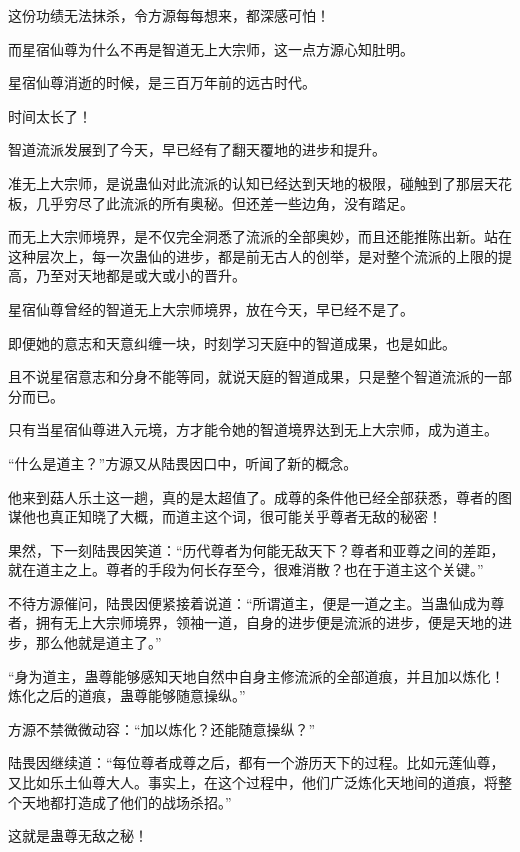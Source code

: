 \begin{this_body}
这份功绩无法抹杀，令方源每每想来，都深感可怕！

而星宿仙尊为什么不再是智道无上大宗师，这一点方源心知肚明。

星宿仙尊消逝的时候，是三百万年前的远古时代。

时间太长了！

智道流派发展到了今天，早已经有了翻天覆地的进步和提升。

准无上大宗师，是说蛊仙对此流派的认知已经达到天地的极限，碰触到了那层天花板，几乎穷尽了此流派的所有奥秘。但还差一些边角，没有踏足。

而无上大宗师境界，是不仅完全洞悉了流派的全部奥妙，而且还能推陈出新。站在这种层次上，每一次蛊仙的进步，都是前无古人的创举，是对整个流派的上限的提高，乃至对天地都是或大或小的晋升。

星宿仙尊曾经的智道无上大宗师境界，放在今天，早已经不是了。

即便她的意志和天意纠缠一块，时刻学习天庭中的智道成果，也是如此。

且不说星宿意志和分身不能等同，就说天庭的智道成果，只是整个智道流派的一部分而已。

只有当星宿仙尊进入元境，方才能令她的智道境界达到无上大宗师，成为道主。

“什么是道主？”方源又从陆畏因口中，听闻了新的概念。

他来到菇人乐土这一趟，真的是太超值了。成尊的条件他已经全部获悉，尊者的图谋他也真正知晓了大概，而道主这个词，很可能关乎尊者无敌的秘密！

果然，下一刻陆畏因笑道：“历代尊者为何能无敌天下？尊者和亚尊之间的差距，就在道主之上。尊者的手段为何长存至今，很难消散？也在于道主这个关键。”

不待方源催问，陆畏因便紧接着说道：“所谓道主，便是一道之主。当蛊仙成为尊者，拥有无上大宗师境界，领袖一道，自身的进步便是流派的进步，便是天地的进步，那么他就是道主了。”

“身为道主，蛊尊能够感知天地自然中自身主修流派的全部道痕，并且加以炼化！炼化之后的道痕，蛊尊能够随意操纵。”

方源不禁微微动容：“加以炼化？还能随意操纵？”

陆畏因继续道：“每位尊者成尊之后，都有一个游历天下的过程。比如元莲仙尊，又比如乐土仙尊大人。事实上，在这个过程中，他们广泛炼化天地间的道痕，将整个天地都打造成了他们的战场杀招。”

这就是蛊尊无敌之秘！

\end{this_body}

